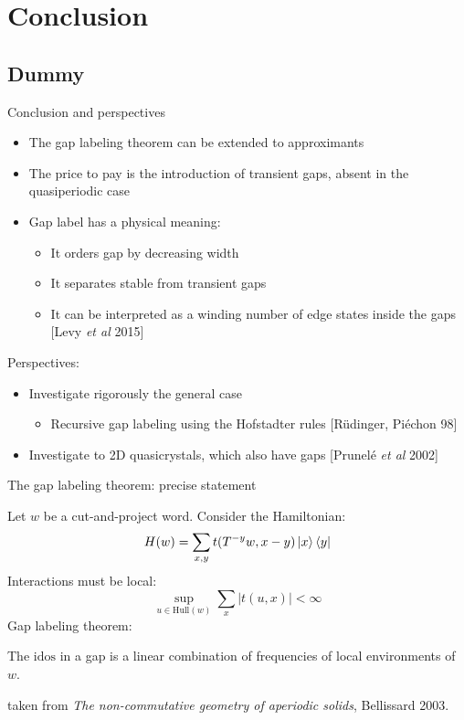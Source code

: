 \documentclass[xcolor=x11names,compress,professionalfonts]{beamer}
\renewcommand{\(}{\begin{columns}}
\renewcommand{\)}{\end{columns}}
\newcommand{\<}[1]{\begin{column}{#1}}
\renewcommand{\>}{\end{column}}
\newcommand{\id}{\ensuremath{\text{idos}}}
\begin{document}
\section{Conclusion}
\subsection{Dummy}
\begin{frame}{Conclusion and perspectives}
\begin{itemize}
	\item The gap labeling theorem can be extended to approximants
	\item The price to pay is the introduction of transient gaps, absent in the quasiperiodic case
	\item Gap label has a physical meaning:
	\begin{itemize}
		\item It orders gap by decreasing width
		\item It separates stable from transient gaps
		\item It can be interpreted as a winding number of edge states inside the gaps \small{[Levy \emph{et al} 2015]}
	\end{itemize}
\end{itemize}
Perspectives:
\begin{itemize}
	\item Investigate rigorously the general case
	\begin{itemize}
		\item Recursive gap labeling using the Hofstadter rules  \small{[Rüdinger, Piéchon 98]}
	\end{itemize}
	\item Investigate to 2D quasicrystals, which also have gaps \small{[Prunelé \emph{et al} 2002]}
\end{itemize}
\end{frame}

\begin{frame}{The gap labeling theorem: precise statement}

Let $w$ be a cut-and-project word.
Consider the Hamiltonian:
\[
	H(w) = \sum_{x,y} t( T^{-y}w, x-y) \ket{x} \bra{y}
\]
Interactions must be local:
\[
	\sup_{u \in \text{Hull}(w)} \sum_x |t(u, x)| < \infty
\]
Gap labeling theorem:

The $\id$ in a gap is a linear combination of frequencies of local environments of $w$.
{\flushright
\small{taken from \textit{The non-commutative geometry of aperiodic solids}, Bellissard 2003.}

}
\end{frame}
\end{document}
